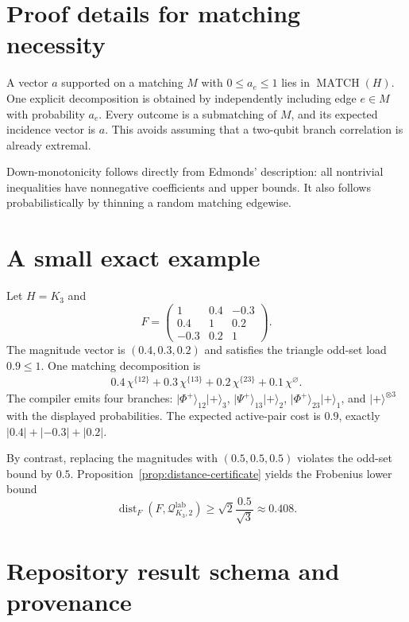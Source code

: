 \documentclass[11pt]{article}
\theoremstyle{definition}
\theoremstyle{remark}
\newcommand{\Q}{\mathcal{Q}}
\newcommand{\MATCH}{\operatorname{MATCH}}
\newcommand{\dist}{\operatorname{dist}}
\newcommand{\lab}{\mathrm{lab}}
\newcommand{\ket}[1]{\lvert #1\rangle}
\begin{document}
\section{Proof details for matching necessity}

A vector $a$ supported on a matching $M$ with $0\le a_e\le1$ lies in $\MATCH(H)$. One explicit decomposition is obtained by independently including edge $e\in M$ with probability $a_e$. Every outcome is a submatching of $M$, and its expected incidence vector is $a$. This avoids assuming that a two-qubit branch correlation is already extremal.

Down-monotonicity follows directly from Edmonds' description: all nontrivial inequalities have nonnegative coefficients and upper bounds. It also follows probabilistically by thinning a random matching edgewise.

\section{A small exact example}

Let $H=K_3$ and
\begin{equation}
  F=\begin{pmatrix}
  1&0.4&-0.3\\
  0.4&1&0.2\\
  -0.3&0.2&1
  \end{pmatrix}.
\end{equation}
The magnitude vector is $(0.4,0.3,0.2)$ and satisfies the triangle odd-set load $0.9\le1$. One matching decomposition is
\begin{align}
  0.4\,\chi^{\{12\}}
  +0.3\,\chi^{\{13\}}
  +0.2\,\chi^{\{23\}}
  +0.1\,\chi^{\varnothing}.
\end{align}
The compiler emits four branches: $\ket{\Phi^+}_{12}\ket{+}_3$, $\ket{\Psi^+}_{13}\ket{+}_2$, $\ket{\Phi^+}_{23}\ket{+}_1$, and $\ket{+}^{\otimes3}$ with the displayed probabilities. The expected active-pair cost is $0.9$, exactly $|0.4|+|-0.3|+|0.2|$.

By contrast, replacing the magnitudes with $(0.5,0.5,0.5)$ violates the odd-set bound by $0.5$. Proposition~\ref{prop:distance-certificate} yields the Frobenius lower bound
\begin{equation}
  \dist_F(F,\Q^{\lab}_{K_3,2})
  \ge\sqrt2\frac{0.5}{\sqrt3}\approx0.408.
\end{equation}


\section{Repository result schema and provenance}
\label{app:result-schema}
\end{document}
